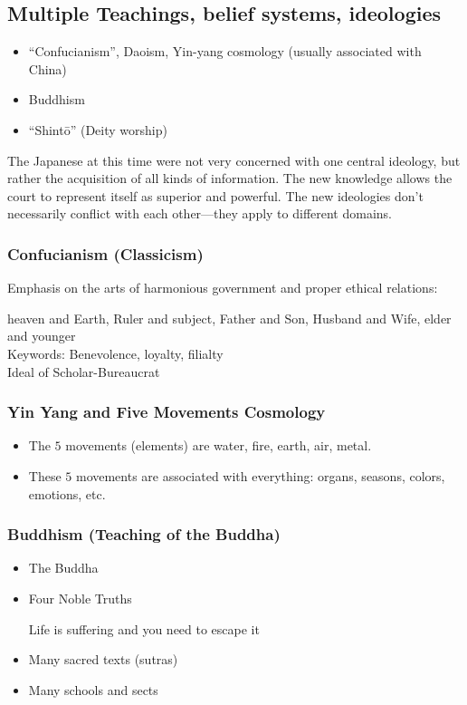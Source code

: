 \documentclass[class=article, crop=false]{standalone}
\begin{document}
  \subsection{Multiple Teachings, belief systems, ideologies}
  \begin{itemize}
    \item ``Confucianism'', Daoism, Yin-yang cosmology (usually associated with China)
    \item Buddhism
    \item ``Shint\=o'' (Deity worship)
  \end{itemize}
  \begin{note}{}
    The Japanese at this time were not very concerned with one central ideology, but rather the acquisition of all kinds of information. The new knowledge allows the court to represent itself as superior and powerful. The new ideologies don't necessarily conflict with each other---they apply to different domains.
  \end{note}
  \subsubsection{Confucianism (Classicism)}
  Emphasis on the arts of harmonious government and proper ethical relations: \par
  heaven and Earth, Ruler and subject, Father and Son, Husband and Wife, elder and younger \\
  Keywords: Benevolence, loyalty, filialty \\
  Ideal of Scholar-Bureaucrat
  \subsubsection{Yin Yang and Five Movements Cosmology}
  \begin{itemize}
    \item The $5$ movements (elements) are water, fire, earth, air, metal.
    \item These $5$ movements are associated with everything: organs, seasons, colors, emotions, etc.
  \end{itemize}
  \subsubsection{Buddhism (Teaching of the Buddha)}
  \begin{itemize}
    \item The Buddha
    \item Four Noble Truths
      \begin{note}{}
        Life is suffering and you need to escape it
      \end{note}
    \item Many sacred texts (sutras)
    \item Many schools and sects
  \end{itemize}
\end{document}
